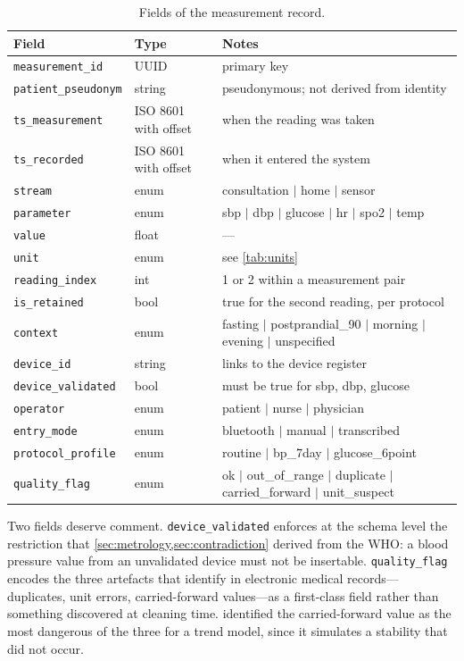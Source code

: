 \documentclass[12pt,a4paper,oneside]{report}
\begin{document}
\begin{table}[htbp]
\centering\footnotesize
\caption{Fields of the measurement record.}\label{tab:measurement-record}
\begin{tabularx}{\textwidth}{@{}>{\raggedright\arraybackslash}p{3.1cm} >{\raggedright\arraybackslash}p{2.6cm} X@{}}
\toprule
\textbf{Field} & \textbf{Type} & \textbf{Notes} \\
\midrule
\texttt{measurement\_id} & UUID & primary key \\
\texttt{patient\_pseudonym} & string & pseudonymous; not derived from identity \\
\texttt{ts\_measurement} & ISO 8601 with offset & when the reading was taken \\
\texttt{ts\_recorded} & ISO 8601 with offset & when it entered the system \\
\texttt{stream} & enum & consultation $\mid$ home $\mid$ sensor \\
\texttt{parameter} & enum & sbp $\mid$ dbp $\mid$ glucose $\mid$ hr $\mid$ spo2 $\mid$ temp \\
\texttt{value} & float & --- \\
\texttt{unit} & enum & see \cref{tab:units} \\
\texttt{reading\_index} & int & 1 or 2 within a measurement pair \\
\texttt{is\_retained} & bool & true for the second reading, per protocol \\
\texttt{context} & enum & fasting $\mid$ postprandial\_90 $\mid$ morning $\mid$ evening $\mid$ unspecified \\
\texttt{device\_id} & string & links to the device register \\
\texttt{device\_validated} & bool & must be true for sbp, dbp, glucose \\
\texttt{operator} & enum & patient $\mid$ nurse $\mid$ physician \\
\texttt{entry\_mode} & enum & bluetooth $\mid$ manual $\mid$ transcribed \\
\texttt{protocol\_profile} & enum & routine $\mid$ bp\_7day $\mid$ glucose\_6point \\
\texttt{quality\_flag} & enum & ok $\mid$ out\_of\_range $\mid$ duplicate $\mid$ carried\_forward $\mid$ unit\_suspect \\
\bottomrule
\end{tabularx}
\end{table}

Two fields deserve comment. \texttt{device\_validated} enforces at the schema level the restriction that \cref{sec:metrology,sec:contradiction} derived from the WHO: a blood pressure value from an unvalidated device must not be insertable. \texttt{quality\_flag} encodes the three artefacts that \textcite{liu2025review} identify in electronic medical records---duplicates, unit errors, carried-forward values---as a first-class field rather than something discovered at cleaning time.  identified the carried-forward value as the most dangerous of the three for a trend model, since it simulates a stability that did not occur.
\end{document}

